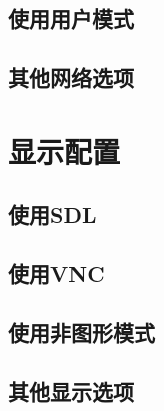 \documentclass[a4paper,left=2.5cm,right=2.5cm,11pt]{article}
\begin{document}
\subsection{使用用户模式}
\subsection{其他网络选项}

\clearpage

\section{显示配置}
\subsection{使用SDL}
\subsection{使用VNC}
\subsection{使用非图形模式}
\subsection{其他显示选项}
\end{document}
